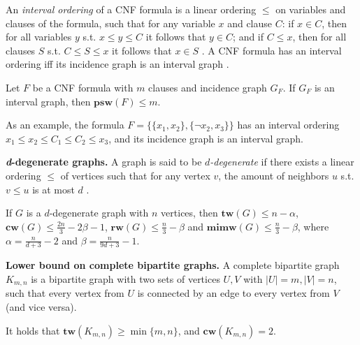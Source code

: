 \noindent
An {\em interval ordering} of a CNF formula is a linear ordering $\leq $ on variables and clauses of the formula, such that for any variable $x$ and clause $C$: if $x \in C$, then for all variables $y$ s.t. $x \leq y \leq C$ it follows that $y \in C$; and if $C \leq x$, then for all clauses $S$ s.t. $C \leq S \leq x$ it follows that $x \in S$ \cite{DBLP:conf/sat/SaetherTV14}.
A CNF formula has an interval ordering iff its incidence graph is an interval graph \cite{DBLP:conf/sat/SaetherTV14}.

\begin{fact}
	Let $F$ be a CNF formula with $m$ clauses and incidence graph $G_F$.
	If $G_F$ is an interval graph, then $\mathbf{psw}(F) \leq m$.
	\label{fact:psw-interval}
\end{fact}

\noindent
As an example, the formula $F=\{ \{x_1, x_2\}, \{\neg x_2, x_3\} \}$ has an interval ordering $x_1 \leq x_2 \leq C_1 \leq C_2 \leq x_3$, and its incidence graph is an interval graph.

\textbf{{\em d}-degenerate graphs.}
A graph is said to be {\em $d$-degenerate} if there exists a linear ordering $\leq$ of vertices such that for any vertex $v$, the amount of neighbors $u$ s.t. $v \leq u$ is at most $d$ \cite{PhD:Vatshelle}.

\begin{fact}
	If $G$ is a $d$-degenerate graph with $n$ vertices, then $\mathbf{tw}(G) \leq n - \alpha$, $\mathbf{cw}(G) \leq \frac{2n}{3} - 2\beta - 1$, $\mathbf{rw}(G) \leq \frac{n}{3} - \beta$ and $\mathbf{mimw}(G) \leq \frac{n}{3} - \beta$, where $\alpha = \frac{n}{d + 3} - 2$ and $\beta = \frac{n}{9d+3} - 1$.
\end{fact}

\textbf{Lower bound on complete bipartite graphs.}
A complete bipartite graph $K_{m,n}$ is a bipartite graph with two sets of vertices $U, V$ with $|U|=m, |V|=n$, such that every vertex from $U$ is connected by an edge to every vertex from $V$ (and vice versa).

\begin{fact}[folklore]
		It holds that $\mathbf{tw}(K_{m,n}) \geq \min \{m,n\}$, and $\mathbf{cw}(K_{m,n})=2$.
\end{fact}



